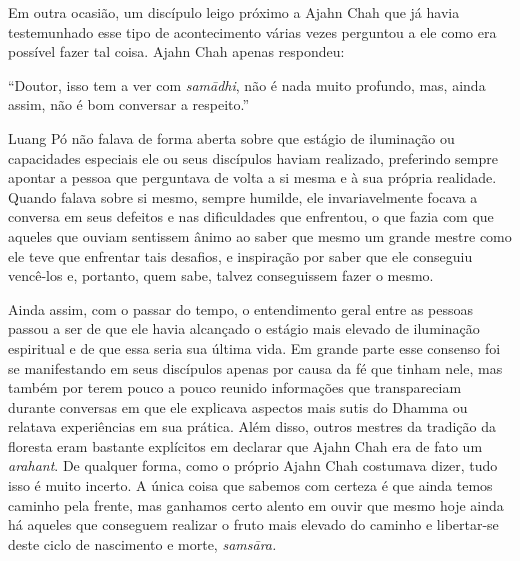 Em outra ocasião, um discípulo leigo próximo a Ajahn Chah que já havia
testemunhado esse tipo de acontecimento várias vezes perguntou a ele
como era possível fazer tal coisa. Ajahn Chah apenas respondeu:

``Doutor, isso tem a ver com \emph{samādhi}, não é nada muito profundo,
mas, ainda assim, não é bom conversar a respeito.''

Luang Pó não falava de forma aberta sobre que estágio de iluminação ou
capacidades especiais ele ou seus discípulos haviam realizado,
preferindo sempre apontar a pessoa que perguntava de volta a si mesma e
à sua própria realidade. Quando falava sobre si mesmo, sempre humilde,
ele invariavelmente focava a conversa em seus defeitos e nas
dificuldades que enfrentou, o que fazia com que aqueles que ouviam
sentissem ânimo ao saber que mesmo um grande mestre como ele teve que
enfrentar tais desafios, e inspiração por saber que ele conseguiu
vencê-los e, portanto, quem sabe, talvez conseguissem fazer o mesmo.

Ainda assim, com o passar do tempo, o entendimento geral entre as
pessoas passou a ser de que ele havia alcançado o estágio mais elevado
de iluminação espiritual e de que essa seria sua última vida. Em grande
parte esse consenso foi se manifestando em seus discípulos apenas por
causa da fé que tinham nele, mas também por terem pouco a pouco reunido
informações que transpareciam durante conversas em que ele explicava
aspectos mais sutis do Dhamma ou relatava experiências em sua prática.
Além disso, outros mestres da tradição da floresta eram bastante
explícitos em declarar que Ajahn Chah era de fato um \emph{arahant}. De
qualquer forma, como o próprio Ajahn Chah costumava dizer, tudo isso é
muito incerto. A única coisa que sabemos com certeza é que ainda temos
caminho pela frente, mas ganhamos certo alento em ouvir que mesmo hoje
ainda há aqueles que conseguem realizar o fruto mais elevado do caminho
e libertar-se deste ciclo de nascimento e morte, \emph{samsāra.}

